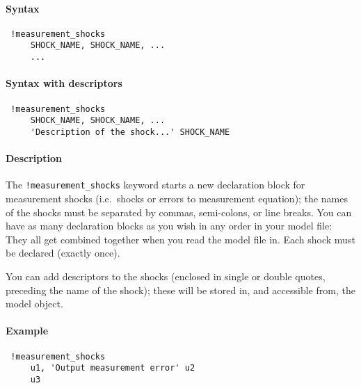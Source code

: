 


	\paragraph{Syntax}
 
 \begin{verbatim}
 !measurement_shocks
     SHOCK_NAME, SHOCK_NAME, ...
     ...
 \end{verbatim}
 
 \paragraph{Syntax with descriptors}
 
 \begin{verbatim}
 !measurement_shocks
     SHOCK_NAME, SHOCK_NAME, ...
     'Description of the shock...' SHOCK_NAME
 \end{verbatim}
 
 \paragraph{Description}
 
 The \texttt{!measurement\_shocks} keyword starts a new declaration block
 for measurement shocks (i.e.~shocks or errors to measurement equation);
 the names of the shocks must be separated by commas, semi-colons, or
 line breaks. You can have as many declaration blocks as you wish in any
 order in your model file: They all get combined together when you read
 the model file in. Each shock must be declared (exactly once).
 
 You can add descriptors to the shocks (enclosed in single or double
 quotes, preceding the name of the shock); these will be stored in, and
 accessible from, the model object.
 
 \paragraph{Example}
 
 \begin{verbatim}
 !measurement_shocks
     u1, 'Output measurement error' u2
     u3
 \end{verbatim}


